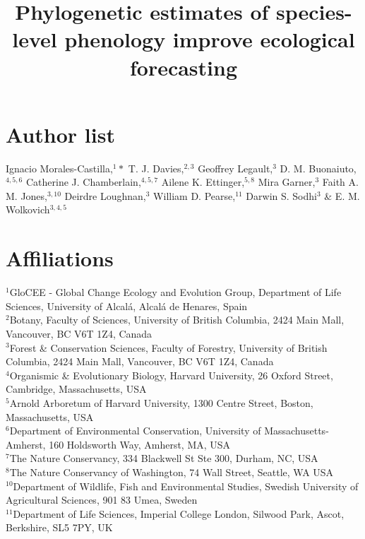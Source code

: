 \documentclass{article}
\begin{document}

% 


\title{Phylogenetic estimates of species-level phenology improve ecological forecasting}

\maketitle



\section*{Author list} 
Ignacio Morales-Castilla,$^{1}*$ T. J. Davies,$^{2,3}$ Geoffrey Legault,$^{3}$ D. M. Buonaiuto,$^{4,5,6}$ Catherine J. Chamberlain,$^{4,5,7}$ Ailene K. Ettinger,$^{5,8}$ Mira Garner,$^{3}$ Faith A. M. Jones,$^{3,10}$ Deirdre Loughnan,$^{3}$ William D. Pearse,$^{11}$ Darwin S. Sodhi$^{3}$ \& E. M. Wolkovich$^{3,4,5}$  \vspace{2ex}\\

\section*{Affiliations} 
$^{1}$GloCEE - Global Change Ecology and Evolution Group, Department of Life Sciences, University of Alcal\'a, Alcal\'a de Henares, Spain\\ %
 $^{2}$Botany, Faculty of Sciences, University of British Columbia, 2424 Main Mall, Vancouver, BC V6T 1Z4, Canada\\
$^{3}$Forest \& Conservation Sciences, Faculty of Forestry, University of British Columbia, 2424 Main Mall, Vancouver, BC V6T 1Z4, Canada\\
$^{4}$Organismic \& Evolutionary Biology, Harvard University, 26 Oxford Street, Cambridge, Massachusetts, USA\\
$^{5}$Arnold Arboretum of Harvard University, 1300 Centre Street, Boston, Massachusetts, USA\\
$^{6}$Department of Environmental Conservation, University of Massachusetts-Amherst, 160 Holdsworth Way, Amherst, MA, USA\\  %
 $^{7}$The Nature Conservancy, 334 Blackwell St Ste 300, Durham, NC, USA \\ %
$^{8}$The Nature Conservancy of Washington, 74 Wall Street, Seattle, WA  USA \\ %
$^{10}$Department of Wildlife, Fish and Environmental Studies, Swedish University of Agricultural Sciences, 901 83 Umea, Sweden\\ %
$^{11}$Department of Life Sciences, Imperial College London, Silwood Park, Ascot, Berkshire, SL5 7PY, UK\\
\end{document}
